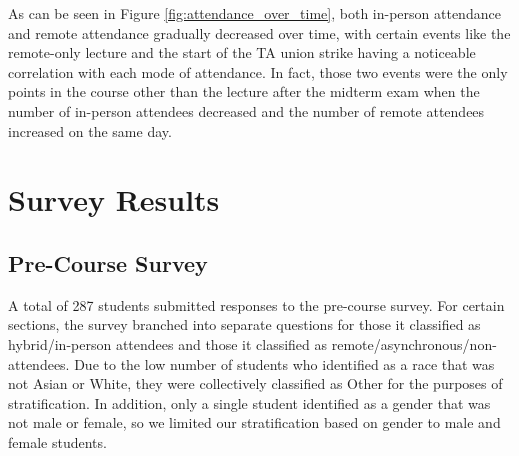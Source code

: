 As can be seen in Figure \ref{fig:attendance_over_time}, both in-person attendance and remote attendance gradually decreased over time, with certain events like the remote-only lecture and the start of the TA union strike having a noticeable correlation with each mode of attendance. In fact, those two events were the only points in the course other than the lecture after the midterm exam when the number of in-person attendees decreased and the number of remote attendees increased on the same day.

\section{Survey Results}

\subsection{Pre-Course Survey}

A total of 287 students submitted responses to the pre-course survey. For certain sections, the survey branched into separate questions for those it classified as hybrid/in-person attendees and those it classified as remote/asynchronous/non-attendees. Due to the low number of students who identified as a race that was not Asian or White, they were collectively classified as Other for the purposes of stratification. In addition, only a single student identified as a gender that was not male or female, so we limited our stratification based on gender to male and female students.

